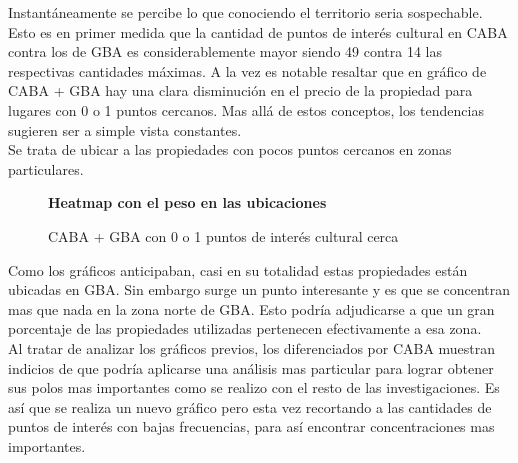 \documentclass[a4paper, 10pt]{article}
\newcommand\tab[1][0.5cm]{\hspace*{#1}}
\begin{document}
				
				Instantáneamente se percibe lo que conociendo el territorio seria sospechable. 
				Esto es en primer medida que la cantidad de puntos de interés cultural en 
				CABA contra los de GBA es considerablemente mayor siendo 49 contra 14 las 
				respectivas cantidades máximas. A la vez es notable resaltar que en gráfico 
				de CABA + GBA hay una clara disminución en el precio de la propiedad para 
				lugares con 0 o 1 puntos cercanos. Mas allá de estos conceptos, los tendencias 
				sugieren ser a simple vista constantes.\\ 
				\tab Se trata de ubicar a las propiedades con pocos puntos cercanos en zonas particulares.						 					
				\begin{figure}[H]
    				\centering
    				\textbf{Heatmap con el peso en las ubicaciones}\par\medskip
    				\caption{CABA + GBA con 0 o 1 puntos de interés cultural cerca}
				\end{figure}				
				
				
				Como los gráficos anticipaban, casi en su totalidad estas propiedades están ubicadas en GBA. 
				Sin embargo surge un punto interesante y es que se concentran mas que nada en la zona 
				norte de GBA. Esto podría adjudicarse a que un gran porcentaje de las propiedades 
				utilizadas pertenecen efectivamente a esa zona.\\ 

				Al tratar de analizar los gráficos previos, los diferenciados por CABA 
				muestran indicios de que podría aplicarse una análisis mas particular para 
				lograr obtener sus polos mas importantes como se realizo con el resto de las 
				investigaciones. Es así que se realiza un nuevo gráfico pero esta vez 
				recortando a las cantidades de puntos de interés con bajas frecuencias, 
				para así encontrar concentraciones mas importantes.	
				
\end{document}
